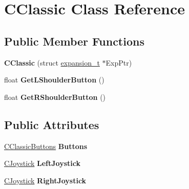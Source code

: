 \hypertarget{class_c_classic}{\section{\-C\-Classic \-Class \-Reference}
\label{class_c_classic}
}
\subsection*{\-Public \-Member \-Functions}
\begin{DoxyCompactItemize}
\item 
\hypertarget{class_c_classic_ac682fe2a19e88a0dd1fff9a12586d6e2}{{\bfseries \-C\-Classic} (struct \hyperlink{structexpansion__t}{expansion\-\_\-t} $\ast$\-Exp\-Ptr)}\label{class_c_classic_ac682fe2a19e88a0dd1fff9a12586d6e2}

\item 
\hypertarget{class_c_classic_a7ea18d3535fb4534790a6b24e33e8c56}{float {\bfseries \-Get\-L\-Shoulder\-Button} ()}\label{class_c_classic_a7ea18d3535fb4534790a6b24e33e8c56}

\item 
\hypertarget{class_c_classic_a58ac294e9273589037f60a1d2e4fcfac}{float {\bfseries \-Get\-R\-Shoulder\-Button} ()}\label{class_c_classic_a58ac294e9273589037f60a1d2e4fcfac}

\end{DoxyCompactItemize}
\subsection*{\-Public \-Attributes}
\begin{DoxyCompactItemize}
\item 
\hypertarget{class_c_classic_a1592d3c639fa90e657cc3c3f741363b8}{\hyperlink{class_c_classic_buttons}{\-C\-Classic\-Buttons} {\bfseries \-Buttons}}\label{class_c_classic_a1592d3c639fa90e657cc3c3f741363b8}

\item 
\hypertarget{class_c_classic_a3469e965eac46db5ecc669d74d8a2420}{\hyperlink{class_c_joystick}{\-C\-Joystick} {\bfseries \-Left\-Joystick}}\label{class_c_classic_a3469e965eac46db5ecc669d74d8a2420}

\item 
\hypertarget{class_c_classic_a65a96a9397c278e0bc5e7f5b7048d855}{\hyperlink{class_c_joystick}{\-C\-Joystick} {\bfseries \-Right\-Joystick}}\label{class_c_classic_a65a96a9397c278e0bc5e7f5b7048d855}

\end{DoxyCompactItemize}
